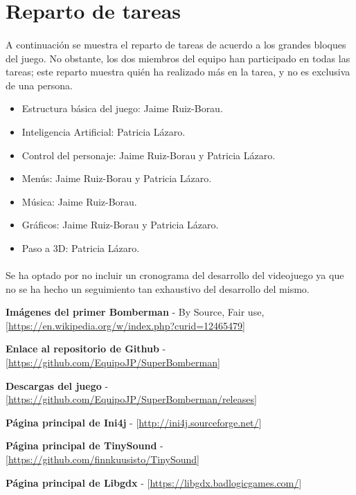 \documentclass[a4paper]{article}
\begin{document}
\newpage
\section{Reparto de tareas}

\paragraph{}A continuación se muestra el reparto de tareas de acuerdo a los grandes bloques del juego. No obstante, los dos miembros del equipo han participado en todas las tareas; este reparto muestra quién ha realizado más en la tarea, y no es exclusiva de una persona.

\begin{itemize}
\item Estructura básica del juego: Jaime Ruiz-Borau.
\item Inteligencia Artificial: Patricia Lázaro.
\item Control del personaje: Jaime Ruiz-Borau y Patricia Lázaro.
\item Menús: Jaime Ruiz-Borau y Patricia Lázaro.
\item Música: Jaime Ruiz-Borau.
\item Gráficos: Jaime Ruiz-Borau y Patricia Lázaro.
\item Paso a 3D: Patricia Lázaro.
\end{itemize}

\paragraph{}Se ha optado por no incluir un cronograma del desarrollo del videojuego ya que no se ha hecho un seguimiento tan exhaustivo del desarrollo del mismo.
\newpage

\begin{thebibliography}{99}
	 \textbf{Imágenes del primer Bomberman} - By Source, Fair use, [\url{https://en.wikipedia.org/w/index.php?curid=12465479}]
	
	\bibitem{} \textbf{Enlace al repositorio de Github} - [\url{https://github.com/EquipoJP/SuperBomberman}]
	
	\bibitem{} \textbf{Descargas del juego} - [\url{https://github.com/EquipoJP/SuperBomberman/releases}]
	
	\bibitem{} \textbf{Página principal de Ini4j} - [\url{http://ini4j.sourceforge.net/}]
	
	\bibitem{} \textbf{Página principal de TinySound} - [\url{https://github.com/finnkuusisto/TinySound}]
	
	\bibitem{} \textbf{Página principal de Libgdx} - [\url{https://libgdx.badlogicgames.com/}]
	
\end{thebibliography}
\end{document}
